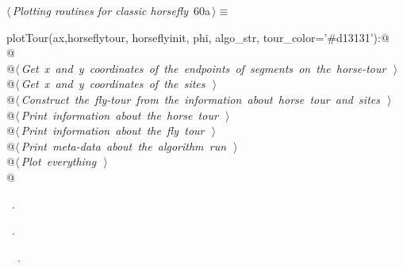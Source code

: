 \documentclass[11.5pt]{report}
\begin{document}
\begin{flushleft} \small\label{scrap82}\raggedright\small
{} $\langle\,${\itshape Plotting routines for classic horsefly}\nobreak\ {\footnotesize {60a}}$\,\rangle\equiv$
\vspace{-1ex}
\begin{list}{}{} \item
\mbox{}\verb@def plotTour(ax,horseflytour, horseflyinit, phi, algo_str, tour_color='#d13131'):@\\
\mbox{}\verb@   @\\
\mbox{}\verb@    @\hbox{$\langle\,${\itshape Get x and y coordinates of the endpoints of segments on the horse-tour}\nobreak\ {\footnotesize {}}$\,\rangle$}\verb@@\\
\mbox{}\verb@    @\hbox{$\langle\,${\itshape Get x and y coordinates of the sites}\nobreak\ {\footnotesize {}}$\,\rangle$}\verb@@\\
\mbox{}\verb@    @\hbox{$\langle\,${\itshape Construct the fly-tour from the information about horse tour and sites}\nobreak\ {\footnotesize {}}$\,\rangle$}\verb@@\\
\mbox{}\verb@    @\hbox{$\langle\,${\itshape Print information about the horse tour}\nobreak\ {\footnotesize {}}$\,\rangle$}\verb@@\\
\mbox{}\verb@    @\hbox{$\langle\,${\itshape Print information about the fly tour}\nobreak\ {\footnotesize {}}$\,\rangle$}\verb@@\\
\mbox{}\verb@    @\hbox{$\langle\,${\itshape Print meta-data about the algorithm run}\nobreak\ {\footnotesize {}}$\,\rangle$}\verb@@\\
\mbox{}\verb@    @\hbox{$\langle\,${\itshape Plot everything}\nobreak\ {\footnotesize {}}$\,\rangle$}\verb@@\\
\mbox{}\verb@    @{\NWsep}
\end{list}
\vspace{-1.5ex}
\footnotesize
\begin{list}{}{\setlength{\itemsep}{-\parsep}\setlength{\itemindent}{-\leftmargin}}
\item \NWtxtMacroDefBy\ .
\item \NWtxtMacroRefIn\ .
\item \NWtxtIdentsDefed\nobreak\  \verb@plotTour@\nobreak\ .
\item{}
\end{list}
\vspace{4ex}
\end{flushleft}
\end{document}
